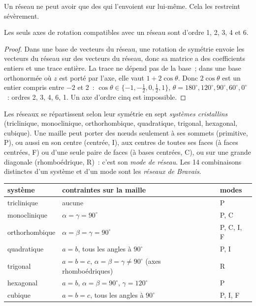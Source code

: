 Un réseau ne peut avoir que des  qui l'envoient sur
lui-même. Cela les restreint sévèrement.

\begin{theorem}\label{thm:b3:x-ray-diffraction:restriction}
Les seuls axes de rotation compatibles avec un réseau sont d'ordre 1, 2,
3, 4 et 6.
\end{theorem}

\begin{proof}
Dans une base de vecteurs du réseau, une rotation de symétrie envoie les
vecteurs du réseau sur des vecteurs du réseau, donc sa matrice a des
coefficients entiers et une trace entière. La trace ne dépend pas de la
base~; dans une base orthonormée où $z$ est porté par l'axe, elle vaut
$1 + 2\cos\theta$. Donc $2\cos\theta$ est un entier compris entre $-2$
et 2~:
$\cos\theta \in \{-1, -\frac12, 0, \frac12, 1\}$, $\theta = 180^\circ, 120^\circ, 90^\circ,
60^\circ, 0^\circ$~: ordres 2, 3, 4, 6, 1. Un axe d'ordre cinq est
impossible.
\end{proof}

\begin{definition}\label{def:b3:x-ray-diffraction:crystal-system}
Les réseaux se répartissent selon leur symétrie en sept \emph{systèmes
cristallins} (triclinique,
monoclinique, orthorhombique, quadratique, trigonal, hexagonal,
cubique). Une maille peut porter des nœuds seulement à ses sommets
(primitive, P), ou aussi en son centre (centrée, I), aux centres de
toutes ses faces (à faces centrées, F) ou d'une seule paire de faces
(à bases centrées, C), ou sur une grande diagonale (rhomboédrique, R)~:
c'est son \emph{mode de réseau}.
Les 14 combinaisons distinctes d'un système et d'un mode sont les
\emph{réseaux de Bravais}.
\end{definition}

\begin{center}\small
\begin{tabular}{lll}
\hline
système & contraintes sur la maille & modes \\ \hline
triclinique & aucune & P \\
monoclinique & $\alpha = \gamma = 90^\circ$ & P, C \\
orthorhombique & $\alpha = \beta = \gamma = 90^\circ$ & P, C, I, F \\
quadratique & $a = b$, tous les angles à $90^\circ$ & P, I \\
trigonal & $a = b = c$, $\alpha = \beta = \gamma \ne 90^\circ$ (axes rhomboédriques) & R \\
hexagonal & $a = b$, $\alpha = \beta = 90^\circ$, $\gamma = 120^\circ$ & P \\
cubique & $a = b = c$, tous les angles à $90^\circ$ & P, I, F \\ \hline
\end{tabular}
\end{center}


